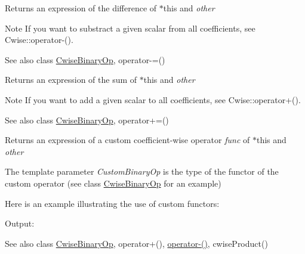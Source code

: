 \begin{DoxyReturn}{Returns}
an expression of the difference of {\ttfamily $\ast$this} and {\itshape other} 
\end{DoxyReturn}
\begin{DoxyNote}{Note}
If you want to substract a given scalar from all coefficients, see Cwise\+::operator-\/().
\end{DoxyNote}
\begin{DoxySeeAlso}{See also}
class \mbox{\hyperlink{class_eigen_1_1_cwise_binary_op}{Cwise\+Binary\+Op}}, operator-\/=()
\end{DoxySeeAlso}
\begin{DoxyReturn}{Returns}
an expression of the sum of {\ttfamily $\ast$this} and {\itshape other} 
\end{DoxyReturn}
\begin{DoxyNote}{Note}
If you want to add a given scalar to all coefficients, see Cwise\+::operator+().
\end{DoxyNote}
\begin{DoxySeeAlso}{See also}
class \mbox{\hyperlink{class_eigen_1_1_cwise_binary_op}{Cwise\+Binary\+Op}}, operator+=()
\end{DoxySeeAlso}
\begin{DoxyReturn}{Returns}
an expression of a custom coefficient-\/wise operator {\itshape func} of $\ast$this and {\itshape other} 
\end{DoxyReturn}
The template parameter {\itshape Custom\+Binary\+Op} is the type of the functor of the custom operator (see class \mbox{\hyperlink{class_eigen_1_1_cwise_binary_op}{Cwise\+Binary\+Op}} for an example)

Here is an example illustrating the use of custom functors\+: 
\begin{DoxyCodeInclude}{0}
\end{DoxyCodeInclude}
 Output\+: 
\begin{DoxyVerbInclude}
\end{DoxyVerbInclude}


\begin{DoxySeeAlso}{See also}
class \mbox{\hyperlink{class_eigen_1_1_cwise_binary_op}{Cwise\+Binary\+Op}}, operator+(), \mbox{\hyperlink{class_eigen_1_1_array_base_ae04203c232cffc00218bb9cd71396ed6}{operator-\/()}}, cwise\+Product() 
\end{DoxySeeAlso}
\mbox{\label{class_eigen_1_1_array_base_adbbb2eb5bd61e6a5515ae511423d937a}} 
